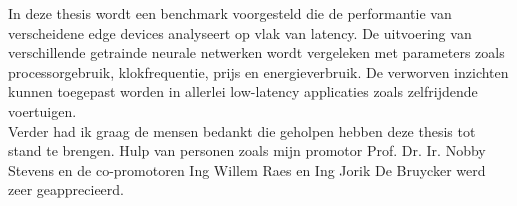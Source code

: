 In deze thesis wordt een benchmark voorgesteld die de performantie van verscheidene edge devices analyseert op vlak van latency. De uitvoering van verschillende getrainde neurale netwerken wordt vergeleken met parameters zoals processorgebruik, klokfrequentie, prijs en energieverbruik. De verworven inzichten kunnen toegepast worden in allerlei low-latency applicaties zoals zelfrijdende voertuigen.\\
Verder had ik graag de mensen bedankt die geholpen hebben deze thesis tot stand te brengen. Hulp van personen zoals mijn promotor Prof. Dr. Ir. Nobby Stevens en de co-promotoren Ing Willem Raes en Ing Jorik De Bruycker werd zeer geapprecieerd.

